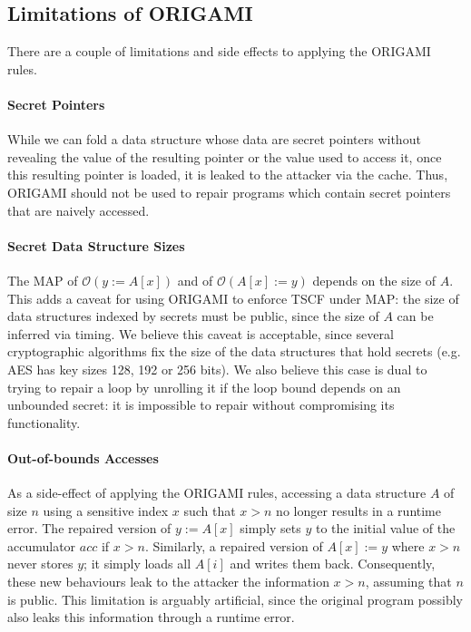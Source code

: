 \subsection{Limitations of ORIGAMI}
\label{sec:SideChannels:Limitations}
There are a couple of limitations and side effects to applying the ORIGAMI rules. 

\paragraph*{Secret Pointers} While we can fold a data structure whose data are secret pointers without revealing the value of the resulting pointer or the value used to access it, once this resulting pointer is loaded, it is leaked to the attacker via the cache. Thus, ORIGAMI should not be used to repair programs which contain secret pointers that are naively accessed. %

\paragraph*{Secret Data Structure Sizes} The MAP of $\mathscr{O}(y:=A[x])$ and of $\mathscr{O}(A[x]:=y)$ depends on the size of $A$. This adds a caveat for using ORIGAMI to enforce TSCF under MAP: the size of data structures indexed by secrets must be public, since the size of $A$ can be inferred via timing. We believe this caveat is acceptable, since several cryptographic algorithms fix the size of the data structures that hold secrets (e.g. AES has key sizes 128, 192 or 256 bits). We also believe this case is dual to trying to repair a loop by unrolling it if the loop bound depends on an unbounded secret: it is impossible to repair without compromising its functionality\cite{SCEliminator,MSESC}.

\paragraph*{Out-of-bounds Accesses} As a side-effect of applying the ORIGAMI rules, accessing a data structure $A$ of size $n$ using a sensitive index $x$ such that $x>n$ no longer results in a runtime error. The repaired version of $y:=A[x]$ simply sets $y$ to the initial value of the accumulator $acc$ if $x>n$. Similarly, a repaired version of $A[x]:=y$ where $x>n$ never stores $y$; it simply loads all $A[i]$ and writes them back. Consequently, these new behaviours leak to the attacker the information $x>n$, assuming that $n$ is public. This limitation is arguably artificial, since the original program possibly also leaks this information through a runtime error.

